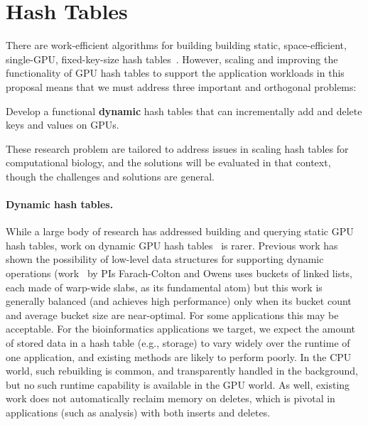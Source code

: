 
\section{Hash Tables} \label{sec:hash-tables}
There are work-efficient algorithms for building building static, space-efficient, single-GPU, fixed-key-size hash tables~\cite{Awad:2023:AAI}.  However, scaling and improving the functionality of GPU hash tables to support the application workloads in this proposal means that  we must address three important and orthogonal problems:


\begin{rproblem}
  Develop a functional \textbf{dynamic} hash tables that can incrementally add and delete keys and values on GPUs.
  \label{rprob:dynamic-gpu-hashtable}
\end{rproblem}


These research problem are tailored to address issues in scaling hash tables for computational biology, and the solutions will be evaluated in that context, though the challenges and solutions are general.

\paragraph{Dynamic hash tables.}
While a large body of research has addressed building and querying static GPU hash tables, work on dynamic GPU hash tables~\cite{Ashkiani:2018:ADH,Junger:2020:WAL,Li:2021:DDH,Zhou:2021:DAD} is rarer. Previous work has shown the possibility of low-level data structures for supporting dynamic operations (work~\cite{Ashkiani:2018:ADH} by PIs Farach-Colton and Owens uses buckets of linked lists, each made of warp-wide slabs, as its fundamental atom) but this work is generally balanced (and achieves high performance) only when its bucket count and average bucket size are near-optimal. For some applications this may be acceptable. For the bioinformatics applications we target, we expect the amount of stored data in a hash table (e.g., \kmer storage) to vary widely over the runtime of one application, and existing methods are likely to perform poorly. In the CPU world, such rebuilding is common, and transparently handled in the background, but no such runtime capability is available in the GPU world. As well, existing work does not automatically reclaim memory on deletes, which is pivotal in applications (such as \kmer analysis) with both inserts and deletes.

